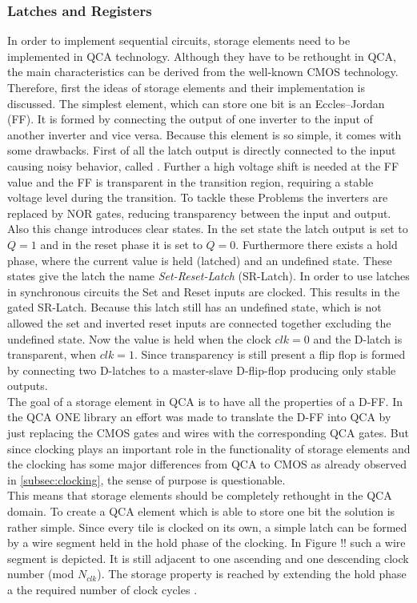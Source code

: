 \subsubsection{Latches and Registers}
In order to implement sequential circuits, storage elements need to be implemented in QCA technology. Although they have to be rethought in QCA, the main characteristics can be derived from the well-known CMOS technology. Therefore, first the ideas of storage elements and their implementation is discussed.
The simplest element, which can store one bit is an Eccles–Jordan  (FF). It is formed by connecting the output of one inverter to the input of another inverter and vice versa. Because this element is so simple, it comes with some drawbacks. First of all the latch output is directly connected to the input causing noisy behavior, called  \cite{hawkins2012cmos}. Further a high voltage shift is needed at the FF value and the FF is transparent in the transition region, requiring a stable voltage level during the transition. To tackle these Problems the inverters are replaced by NOR gates, reducing transparency between the input and output. Also this change introduces clear states. In the set state the latch output is set to $Q=1$ and in the reset phase it is set to $Q=0$. Furthermore there exists a hold phase, where the current value is held (latched) and an undefined state. These states give the latch the name \textit{Set-Reset-Latch} (SR-Latch). In order to use latches in synchronous circuits the Set and Reset inputs are clocked. This results in the gated SR-Latch. Because this latch still has an undefined state, which is not allowed the set and inverted reset inputs are connected together excluding the undefined state. Now the value is held when the clock $clk=0$ and the D-latch is transparent, when $clk=1$. Since transparency is still present a flip flop is formed by connecting two D-latches to a master-slave D-flip-flop producing only stable outputs.\\
The goal of a storage element in QCA is to have all the properties of a D-FF. In the QCA ONE library an effort was made to translate the D-FF into QCA by just replacing the CMOS gates and wires with the corresponding QCA gates. But since clocking plays an important role in the functionality of storage elements and the clocking has some major differences from QCA to CMOS as already observed in \ref{subsec:clocking}, the sense of purpose is questionable.\\
This means that storage elements should be completely rethought in the QCA domain. To create a QCA element which is able to store one bit the solution is rather simple. Since every tile is clocked on its own, a simple latch can be formed by a wire segment held in the hold phase of the clocking. In Figure !! such a wire segment is depicted. It is still adjacent to one ascending and one descending clock number (mod $N_{clk}$). The storage property is reached by extending the hold phase a the required number of clock cycles \cite{Walter}. 
